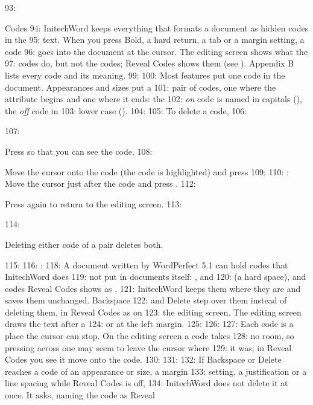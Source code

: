 93: \begin{Feature}{Codes}
94: InitechWord keeps everything that formats a document as hidden codes in the
95: text.  When you press Bold, a hard return, a tab or a margin setting, a code
96: goes into the document at the cursor.  The editing screen shows what the
97: codes do, but not the codes; Reveal Codes shows them (see ).  Appendix B lists every code and its meaning.
99: 
100: Most features put one code in the document.  Appearances and sizes put a
101: pair of codes, one where the attribute begins and one where it ends: the
102: \emph{on} code is named in capitals (\Code{[BOLD]}), the \emph{off} code in
103: lower case (\Code{[bold]}).
104: 
105: To delete a code,
106: \begin{WPSteps}
107: \item Press  so that you can see the code.
108: \item Move the cursor onto the code (the code is highlighted) and press
109: 
110: : Move the cursor just after the code and press .
112: \item Press  again to return to the editing screen.
113: \end{WPSteps}
114: \begin{WPNote}Deleting either code of a pair deletes both.\end{WPNote}
115: 
116: : 
118: A document written by WordPerfect 5.1 can hold codes that InitechWord does
119: not put in documents itself: \Code{[Center]},  and
120: \Code{[ ]} (a hard space), and codes Reveal Codes shows as \Code{[?]}.
121: InitechWord keeps them where they are and saves them unchanged.  Backspace
122: and Delete step over them instead of deleting them, in Reveal Codes as on
123: the editing screen.  The editing screen draws the text after a
124: \Code{[Center]} or  at the left margin.
125: 
126: 
127: Each code is a place the cursor can stop.  On the editing screen a code takes
128: no room, so pressing  across one may seem to leave the cursor where
129: it was; in Reveal Codes you see it move onto the code.
130: 
131: 
132: If Backspace or Delete reaches a code of an appearance or size, a margin
133: setting, a justification or a line spacing while Reveal Codes is off,
134: InitechWord does not delete it at once.  It asks, naming the code as Reveal

\end{Feature}
